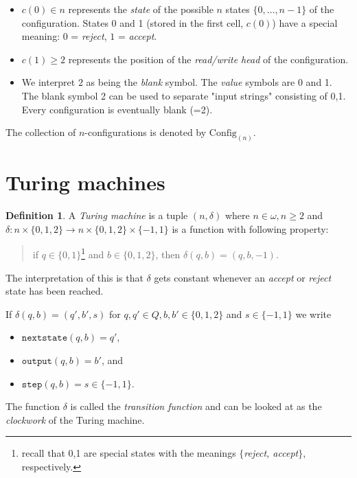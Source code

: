 \documentclass[12pt, a4paper]{amsart}
\theoremstyle{definition}
\newtheorem{definition}[lemma]{Definition}
\newcommand{\C}{\text{Config}}
\begin{document}

\vspace*{1mm}

\begin{itemize}
    \item $c(0)\in n$ represents the {\em state} of the possible $n$ 
        states $\{0,\ldots,n-1\}$ of the configuration. States 0 and 1 
        (stored in the first cell, $c(0)$) have a special meaning: 
        $0$ = {\em reject}, $1$ = {\em accept}.
    \item $c(1) \geq 2$ represents the position of the {\em read/write head}
        of the configuration.
    \item We interpret $2$ as being the {\em blank} symbol. The {\em value} 
        symbols are 0 and 1. The blank symbol 2 can be used to separate "input strings" 
        consisting of 0,1. Every configuration is eventually blank (=2).
\end{itemize}

The collection of $n$-configurations is denoted by $\C_(n)$.

\section{Turing machines}

\begin{definition}
A {\em Turing machine} is a tuple $(n, \delta)$ where $n\in\omega,
    n\geq 2$ and $\delta: n \times \{0,1,2\} \to n \times \{0,1,2\} \times
    \{-1,1\}$ is a function with following property: 
    \begin{quote} if 
    $q \in \{0,1\}$\footnote{recall that 0,1 are special states with 
        the meanings
    $\{${\em reject, accept}$\}$, respectively.}
     and $b\in \{0,1,2\}$, then $\delta(q,b) = (q,b,-1)$.
    \end{quote}
    The interpretation of this is that $\delta$ gets constant
    whenever an {\em accept} or {\em reject} state has been reached.

    If $\delta(q,b) = (q', b', s)$ for $q,q'\in Q, b,b'\in \{0,1,2\}$ and 
    $ s\in \{-1,1\}$
     we write
     \begin{itemize}
            \item $\mathtt{nextstate}(q,b) = q'$,
            \item $\mathtt{output}(q,b) = b'$, and
            \item $\mathtt{step}(q,b) = s\in\{-1,1\}$. 
    \end{itemize}
    The function $\delta$ is called the {\em transition function} and can 
    be looked at as the {\sl clockwork} of the Turing machine.
\end{definition}
\end{document}
